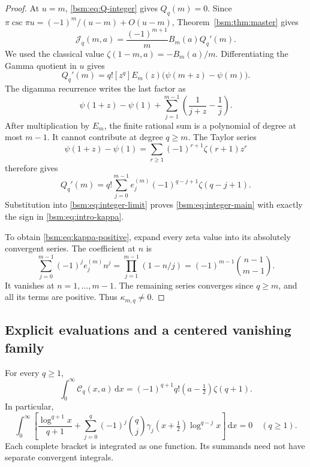 \documentclass[11pt,letterpaper]{article}
\numberwithin{equation}{section}
\theoremstyle{definition}\newtheorem{definition}[theorem]{Definition}
\theoremstyle{remark}\newtheorem{remark}[theorem]{Remark}
\newcommand{\dd}{\,\mathrm{d}}
\newcommand{\Ccal}{\mathcal C}
\newcommand{\Jcal}{\mathcal J}
\newcommand{\Qcal}{Q}
\begin{document}
\begin{proof}
At $u=m$, \eqref{bsm:eq:Q-integer} gives $\Qcal_q(m)=0$. Since
$\pi\csc\pi u=(-1)^m/(u-m)+O(u-m)$, Theorem~\ref{bsm:thm:master} gives
\begin{equation}\label{bsm:eq:integer-limit}
 \Jcal_q(m,a)=\frac{(-1)^{m+1}}m B_m(a)\Qcal_q'(m).
\end{equation}
We used the classical value $\zeta(1-m,a)=-B_m(a)/m$.
Differentiating the Gamma quotient in $u$ gives
\begin{equation}\label{bsm:eq:Q-derivative}
 \Qcal_q'(m)=q![z^q]E_m(z)\bigl(\psi(m+z)-\psi(m)\bigr).
\end{equation}
The digamma recurrence writes the last factor as
\[
 \psi(1+z)-\psi(1)
       +\sum_{j=1}^{m-1}\left(\frac1{j+z}-\frac1j\right).
\]
After multiplication by $E_m$, the finite rational sum is a polynomial
of degree at most $m-1$. It cannot contribute at degree $q\ge m$.
The Taylor series
\[
 \psi(1+z)-\psi(1)=\sum_{r\ge1}(-1)^{r+1}\zeta(r+1)z^r
\]
therefore gives
\begin{equation}\label{bsm:eq:Qprime}
 \Qcal_q'(m)=q!\sum_{j=0}^{m-1}
                    e_j^{(m)}(-1)^{q-j+1}\zeta(q-j+1).
\end{equation}
Substitution into \eqref{bsm:eq:integer-limit} proves
\eqref{bsm:eq:integer-main} with exactly the sign in
\eqref{bsm:eq:intro-kappa}.

To obtain \eqref{bsm:eq:kappa-positive}, expand every zeta value into its
absolutely convergent series. The coefficient at $n$ is
\[
 \sum_{j=0}^{m-1}(-1)^j e_j^{(m)}n^j
 =\prod_{j=1}^{m-1}(1-n/j)
 =(-1)^{m-1}\binom{n-1}{m-1}.
\]
It vanishes at $n=1,\ldots,m-1$. The remaining series converges since
$q\ge m$, and all its terms are positive. Thus $\kappa_{m,q}\ne0$.
\end{proof}

\subsection{Explicit evaluations and a centered vanishing family}
For every $q\ge1$,
\begin{equation}\label{bsm:eq:unweighted}
 \boxed{\displaystyle
 \int_0^\infty\Ccal_q(x,a)\dd x
       =(-1)^{q+1}q!(a-\tfrac12)\zeta(q+1).}
\end{equation}
In particular,
\begin{equation}\label{bsm:eq:centered-zero}
 \int_0^\infty\left[
 \frac{\log^{q+1}x}{q+1}
 +\sum_{j=0}^q(-1)^j\binom qj
                \gamma_j(x+\tfrac12)\log^{q-j}x\right]\dd x=0
 \quad(q\ge1).
\end{equation}
Each complete bracket is integrated as one function. Its summands
need not have separate convergent integrals.
\end{document}
